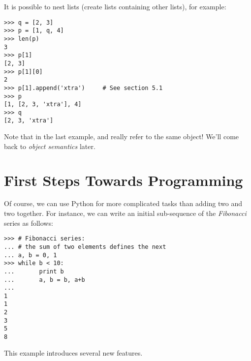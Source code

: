 \documentclass{manual}
\begin{document}
It is possible to nest lists (create lists containing other lists),
for example:

\begin{verbatim}
>>> q = [2, 3]
>>> p = [1, q, 4]
>>> len(p)
3
>>> p[1]
[2, 3]
>>> p[1][0]
2
>>> p[1].append('xtra')     # See section 5.1
>>> p
[1, [2, 3, 'xtra'], 4]
>>> q
[2, 3, 'xtra']
\end{verbatim}

Note that in the last example,  and  really refer to
the same object!  We'll come back to \emph{object semantics} later.

\section{First Steps Towards Programming \label{firstSteps}}

Of course, we can use Python for more complicated tasks than adding
two and two together.  For instance, we can write an initial
sub-sequence of the \emph{Fibonacci} series as follows:

\begin{verbatim}
>>> # Fibonacci series:
... # the sum of two elements defines the next
... a, b = 0, 1
>>> while b < 10:
...       print b
...       a, b = b, a+b
... 
1
1
2
3
5
8
\end{verbatim}

This example introduces several new features.
\end{document}
